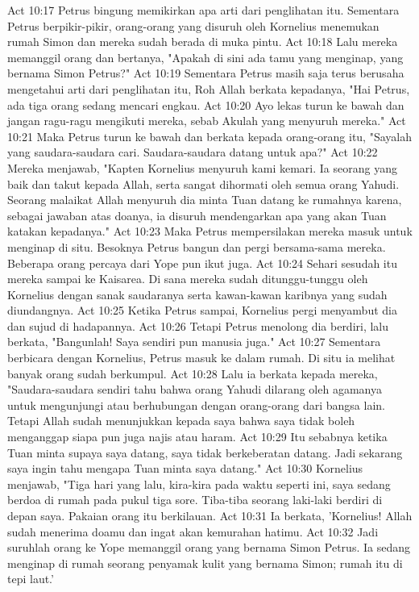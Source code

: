 Act 10:17  Petrus bingung memikirkan apa arti dari penglihatan itu. Sementara Petrus berpikir-pikir, orang-orang yang disuruh oleh Kornelius menemukan rumah Simon dan mereka sudah berada di muka pintu.
Act 10:18  Lalu mereka memanggil orang dan bertanya, "Apakah di sini ada tamu yang menginap, yang bernama Simon Petrus?"
Act 10:19  Sementara Petrus masih saja terus berusaha mengetahui arti dari penglihatan itu, Roh Allah berkata kepadanya, "Hai Petrus, ada tiga orang sedang mencari engkau.
Act 10:20  Ayo lekas turun ke bawah dan jangan ragu-ragu mengikuti mereka, sebab Akulah yang menyuruh mereka."
Act 10:21  Maka Petrus turun ke bawah dan berkata kepada orang-orang itu, "Sayalah yang saudara-saudara cari. Saudara-saudara datang untuk apa?"
Act 10:22  Mereka menjawab, "Kapten Kornelius menyuruh kami kemari. Ia seorang yang baik dan takut kepada Allah, serta sangat dihormati oleh semua orang Yahudi. Seorang malaikat Allah menyuruh dia minta Tuan datang ke rumahnya karena, sebagai jawaban atas doanya, ia disuruh mendengarkan apa yang akan Tuan katakan kepadanya."
Act 10:23  Maka Petrus mempersilakan mereka masuk untuk menginap di situ. Besoknya Petrus bangun dan pergi bersama-sama mereka. Beberapa orang percaya dari Yope pun ikut juga.
Act 10:24  Sehari sesudah itu mereka sampai ke Kaisarea. Di sana mereka sudah ditunggu-tunggu oleh Kornelius dengan sanak saudaranya serta kawan-kawan karibnya yang sudah diundangnya.
Act 10:25  Ketika Petrus sampai, Kornelius pergi menyambut dia dan sujud di hadapannya.
Act 10:26  Tetapi Petrus menolong dia berdiri, lalu berkata, "Bangunlah! Saya sendiri pun manusia juga."
Act 10:27  Sementara berbicara dengan Kornelius, Petrus masuk ke dalam rumah. Di situ ia melihat banyak orang sudah berkumpul.
Act 10:28  Lalu ia berkata kepada mereka, "Saudara-saudara sendiri tahu bahwa orang Yahudi dilarang oleh agamanya untuk mengunjungi atau berhubungan dengan orang-orang dari bangsa lain. Tetapi Allah sudah menunjukkan kepada saya bahwa saya tidak boleh menganggap siapa pun juga najis atau haram.
Act 10:29  Itu sebabnya ketika Tuan minta supaya saya datang, saya tidak berkeberatan datang. Jadi sekarang saya ingin tahu mengapa Tuan minta saya datang."
Act 10:30  Kornelius menjawab, "Tiga hari yang lalu, kira-kira pada waktu seperti ini, saya sedang berdoa di rumah pada pukul tiga sore. Tiba-tiba seorang laki-laki berdiri di depan saya. Pakaian orang itu berkilauan.
Act 10:31  Ia berkata, 'Kornelius! Allah sudah menerima doamu dan ingat akan kemurahan hatimu.
Act 10:32  Jadi suruhlah orang ke Yope memanggil orang yang bernama Simon Petrus. Ia sedang menginap di rumah seorang penyamak kulit yang bernama Simon; rumah itu di tepi laut.'
